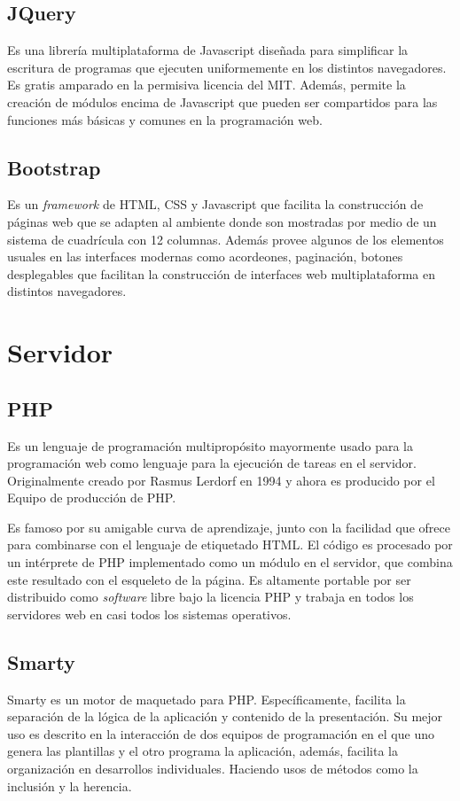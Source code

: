 \subsection{JQuery}
Es una librería multiplataforma de Javascript diseñada para simplificar la escritura de programas que ejecuten uniformemente en los distintos navegadores. Es gratis amparado en la permisiva licencia del MIT. Además, permite la creación de módulos encima de Javascript que pueden ser compartidos para las funciones más básicas y comunes en la programación web\cite{bib:jquery}. 


\subsection{Bootstrap}
Es un \emph{framework} de \gls{HTML}, \gls{CSS} y Javascript que facilita la construcción de páginas web que se adapten al ambiente donde son mostradas por medio de un sistema de cuadrícula con 12 columnas. Además provee algunos de los elementos usuales en las interfaces modernas como acordeones, paginación, botones desplegables que facilitan la construcción de interfaces web multiplataforma en distintos navegadores\cite{bib:bootstrap}.


\section{Servidor}

\subsection{PHP}

Es un lenguaje de programación multipropósito mayormente usado para la programación web como lenguaje para la ejecución de tareas en el servidor. Originalmente creado por Rasmus Lerdorf en 1994 y ahora es producido por el Equipo de producción de \gls{PHP}. 

Es famoso por su amigable curva de aprendizaje, junto con la facilidad que ofrece para combinarse con el lenguaje de etiquetado \gls{HTML}. El código es procesado por un intérprete de \gls{PHP} implementado como un módulo en el servidor, que combina este resultado con el esqueleto de la página. Es altamente portable por ser distribuido como \emph{software} libre bajo la licencia \gls{PHP} y trabaja en todos los servidores web en casi todos los sistemas operativos\cite{bib:php}. 

\subsection{Smarty}
Smarty es un motor de maquetado para \gls{PHP}. Específicamente, facilita la separación de la lógica de la aplicación y contenido de la presentación. Su mejor uso es descrito en la interacción de dos equipos de programación en el que uno genera las plantillas y el otro programa la aplicación, además, facilita la organización en desarrollos individuales. Haciendo usos de métodos como la inclusión y la herencia\cite{bib:smarty}. 

